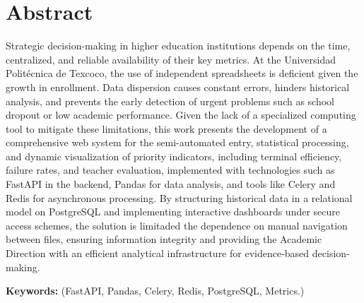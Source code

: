 \section*{Abstract}

Strategic decision-making in higher education institutions depends on the time, centralized, and reliable availability of their key metrics. At the Universidad Politécnica de Texcoco, the use of independent spreadsheets is deficient given the growth in enrollment. Data dispersion causes constant errors, hinders historical analysis, and prevents the early detection of urgent problems such as school dropout or low academic performance. Given the lack of a specialized computing tool to mitigate these limitations, this work presents the development of a comprehensive web system for the semi-automated entry, statistical processing, and dynamic visualization of priority indicators, including terminal efficiency, failure rates, and teacher evaluation, implemented with technologies such as FastAPI in the backend, Pandas for data analysis, and tools like Celery and Redis for asynchronous processing. By structuring historical data in a relational model on PostgreSQL and implementing interactive dashboards under secure access schemes, the solution is limitaded the dependence on manual navigation between files, ensuring information integrity and providing the Academic Direction with an efficient analytical infrastructure for evidence-based decision-making.

\vspace{5cm}\textbf{Keywords:} (FastAPI, Pandas, Celery, Redis, PostgreSQL, Metrics.)
